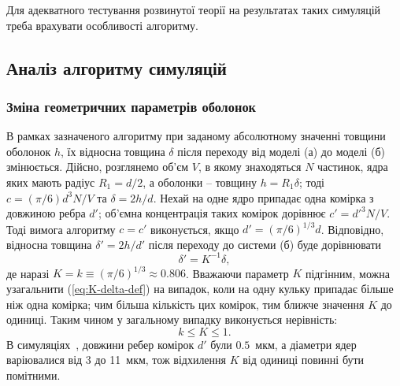 \documentclass[14pt,twoside]{vakthesis}
\begin{document}
Для адекватного тестування розвинутої теорії на результатах 
таких симуляцій треба врахувати особливості алгоритму. 


\subsection{Аналіз алгоритму симуляцій}
\subsubsection{Зміна геометричних параметрів оболонок}

В рамках зазначеного алгоритму при заданому абсолютному значенні товщини оболонок $h$, їх відносна товщина $\delta$ після переходу від моделі (а) до моделі (б) змінюється. Дійсно, розглянемо об'єм $V$, в якому знаходяться $N$ частинок, ядра яких мають радіус $R_1 = d/2$, а оболонки -- товщину $h = R_1\delta$; тоді $c = (\pi/6) d^3 N/V$ та $\delta = 2h/d$. Нехай на одне ядро припадає одна комірка з довжиною ребра $d'$; об'ємна концентрація таких комірок дорівнює $c' = d'^3 N/V$. Тоді вимога алгоритму $c = c'$ виконується, якщо $d' = (\pi/6)^{1/3} d$. Відповідно, відносна товщина $\delta' = 2h/d'$ після переходу до системи (б) буде дорівнювати
\begin{equation}\label{eq:K-delta-def}
\delta' = K^{-1} \delta,
\end{equation}
де наразі $K = k \equiv (\pi/6)^{1/3} \approx 0.806$. Вважаючи параметр $K$ підгінним, можна узагальнити (\ref{eq:K-delta-def}) на випадок, коли на одну кульку припадає більше ніж одна комірка; чим більша кількість цих комірок, тим ближче значення $K$ до одиниці. Таким чином у загальному випадку виконується нерівність:
\begin{equation}\label{eq:K-delta-ineq}
k \leq K \leq 1 .%
\end{equation}
В симуляціях~\cite{Siekierski2005, Siekierski2006, Siekierski2007}, довжини ребер комірок $d'$ були $0.5$~мкм, а діаметри ядер варіювалися від 3 до 11~мкм, тож відхилення $K$ від одиниці повинні бути помітними. 
\end{document}
